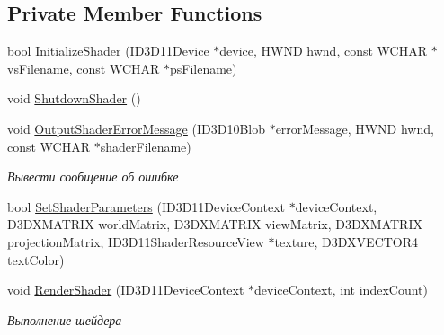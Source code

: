 \subsection*{Private Member Functions}
\begin{DoxyCompactItemize}
\item 
bool \hyperlink{class_font_shader_class_ac600699ff19189fc5443fa21ad52186d}{Initialize\+Shader} (I\+D3\+D11\+Device $\ast$device, H\+W\+ND hwnd, const W\+C\+H\+AR $\ast$vs\+Filename, const W\+C\+H\+AR $\ast$ps\+Filename)
\item 
void \hyperlink{class_font_shader_class_a87650321de006619d5b2a71603a72d06}{Shutdown\+Shader} ()
\item 
void \hyperlink{class_font_shader_class_a706aa79ac8b8f98beeb3dc59f1047e79}{Output\+Shader\+Error\+Message} (I\+D3\+D10\+Blob $\ast$error\+Message, H\+W\+ND hwnd, const W\+C\+H\+AR $\ast$shader\+Filename)
\begin{DoxyCompactList}\small\item\em Вывести сообщение об ошибке \end{DoxyCompactList}\item 
bool \hyperlink{class_font_shader_class_a43ee01d2ff4eba5aec14cc777ff5bd1e}{Set\+Shader\+Parameters} (I\+D3\+D11\+Device\+Context $\ast$device\+Context, D3\+D\+X\+M\+A\+T\+R\+IX world\+Matrix, D3\+D\+X\+M\+A\+T\+R\+IX view\+Matrix, D3\+D\+X\+M\+A\+T\+R\+IX projection\+Matrix, I\+D3\+D11\+Shader\+Resource\+View $\ast$texture, D3\+D\+X\+V\+E\+C\+T\+O\+R4 text\+Color)
\item 
void \hyperlink{class_font_shader_class_aa4e12dada70dd5e925a17aaa6a55576f}{Render\+Shader} (I\+D3\+D11\+Device\+Context $\ast$device\+Context, int index\+Count)
\begin{DoxyCompactList}\small\item\em Выполнение шейдера \end{DoxyCompactList}\end{DoxyCompactItemize}
